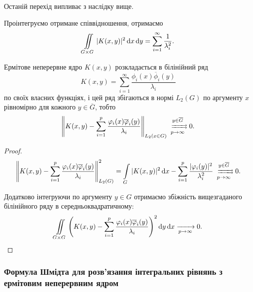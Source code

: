 \begin{remark}
	Останій перехід випливає з наслідку вище.
\end{remark}

Проінтегруємо отримане співвідношення, отримаємо
\begin{equation}
	\displaystyle\iint\limits_{G \times G} |K(x, y)|^2 \mathop{}\!\mathrm{d} x \mathop{}\!\mathrm{d} y = \displaystyle\sum\limits_{i = 1}^\infty \dfrac{1}{\lambda_i^2}.
\end{equation}

\begin{theorem}
	Ермітове неперервне ядро $K(x, y)$ розкладається в білінійний ряд
	\begin{equation}
		K(x, y) = \sum_{i=1}^\infty \frac{\phi_i(x) \overline \phi_i(y)}{\lambda_i}
	\end{equation}
	по своїх власних функціях, і цей ряд збігаються в нормі $L_2(G)$ по аргументу $x$ рівномірно для кожного $y \in \overline G$, тобто 
	\begin{equation}
		\left\| K(x, y) - \Sum_{i=1}^p \dfrac{\phi_i(x)\overline \phi_i(y)}{\lambda_i}\right\|_{L_2(x \in G)} \xrightrightarrows[p \to \infty]{y \in \overline G} 0.
	\end{equation}
\end{theorem}

\begin{proof}
	\begin{equation}
		\left\| K(x, y) - \Sum_{i = 1}^p \dfrac{\phi_i(x) \overline \phi_i(y)}{\lambda_i} \right\|_{L_2(G)}^2 = \Int_G |K(x, y)|^2 \diff x - \Sum_{i = 1}^p \dfrac{|\phi_i(y)|^2}{\lambda_i^2} \xrightrightarrows[p \to \infty]{y \in \overline G} 0.
	\end{equation}

	Додатково інтегруючи по аргументу $y \in G$ отримаємо збіжність вищезгаданого білінійного ряду в середньоквадратичному:
	\begin{equation}
		\displaystyle\iint\limits_{G \times G} \left( K(x, y) - \displaystyle\sum\limits_{i = 1}^p \dfrac{\varphi_i(x) \overline {\varphi}_i(y)}{\lambda_i} \right)^2 \mathop{}\!\mathrm{d} y \mathop{}\!\mathrm{d} x\xrightarrow[p \to \infty]{} 0.
	\end{equation}
\end{proof}

\subsubsection{Формула Шмідта для розв'язання інтегральних рівнянь з ермітовим неперервним ядром}

